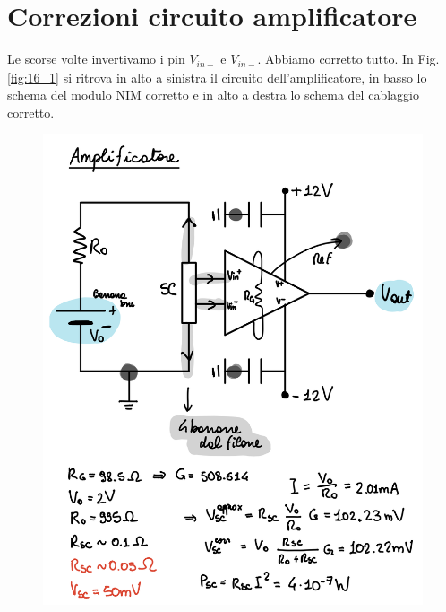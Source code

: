 \documentclass[../main/main.tex]{subfiles}
\begin{document}

\section{Correzioni circuito amplificatore}

Le scorse volte invertivamo i pin \( V_{in+} \) e \( V_{in-} \). Abbiamo corretto tutto. In Fig. \ref{fig:16_1} si ritrova in alto a sinistra il circuito dell'amplificatore, in basso lo schema del modulo NIM corretto e in alto a destra lo schema del cablaggio corretto.

\begin{figure}[h!]
\begin{minipage}[c]{0.5\linewidth}
\centering
\includegraphics[width=1\textwidth]{../lessons/image/16/amplificatore.png}
\end{minipage}
\begin{minipage}[]{0.5\linewidth}
\centering

\end{minipage}
\end{figure}
\end{document}
